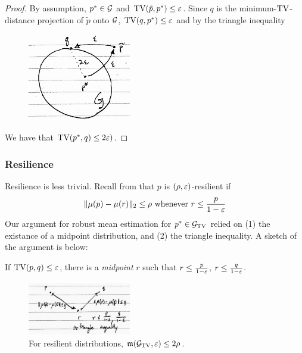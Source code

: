 \begin{proof}
  By assumption, $p^* \in \mathcal{G}$ and $\operatorname{TV}(\tilde{p}, p^*) \leq \varepsilon$.
  Since $q$ is the minimum-$\operatorname{TV}$-distance projection of $\tilde{p}$
  onto $\mathcal{G}$, $\operatorname{TV}(q, p^*) \leq \varepsilon$ and by the triangle inequality
  \begin{figure}[H]
    \begin{center}
      \includegraphics[width=0.4\textwidth]{figures/10-8-1.png}
    \end{center}
  \end{figure}
  We have that $\operatorname{TV}(p^*, q) \leq 2 \varepsilon)$.
\end{proof}

\subsubsection{Resilience}

Resilience is less trivial.  Recall
from  that
$p$ is $(\rho, \varepsilon)$-resilient if
\begin{align}
  \|\mu(p) - \mu(r)\|_2 \leq \rho~\text{whenever}~r \leq \frac{p}{1-\varepsilon}
\end{align}
Our argument for robust mean estimation for $p^* \in \mathcal{G}_{\operatorname{TV}}$
relied on (1) the existance of a midpoint distribution, and
(2) the triangle inequality. A sketch of the argument is below:
\begin{lemma}
  If $\operatorname{TV}(p, q) \leq \varepsilon$, there is a \emph{midpoint} $r$ such that
  $r \leq \frac{p}{1-\varepsilon}$, $r \leq \frac{q}{1-\varepsilon}$.
\end{lemma}

\begin{figure}[H]
  \begin{center}
    \includegraphics[width=0.4\textwidth]{figures/10-8-2.png}
  \end{center}
  \caption{For resilient distributions, $\mathfrak{m}(\mathcal{G}_{\operatorname{TV}}, \varepsilon) \leq 2 \rho$.}
  \label{fig:res-dist-mdf-triangle}
\end{figure}

